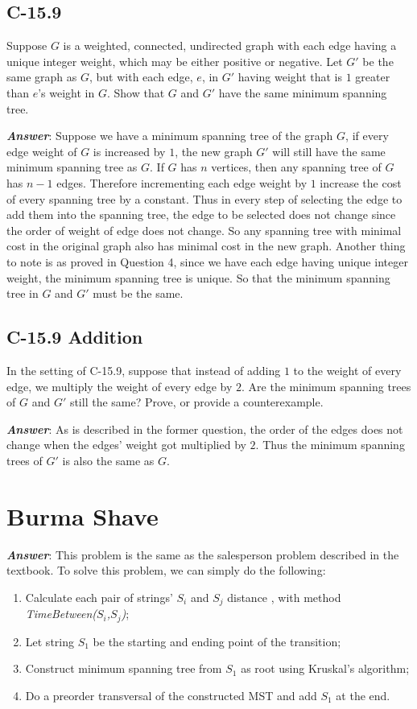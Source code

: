 \documentclass[11pt]{article}
\begin{document}
\subsection{C-15.9}
Suppose $G$ is a weighted, connected, undirected graph with each edge having a unique integer weight, which may be either positive or negative. Let $G'$ be the same graph as $G$, but with each edge, $e$, in $G'$ having weight that is $1$ greater than $e$’s weight in $G$. Show that $G$ and $G'$ have the same minimum spanning tree.

\noindent \textbf{\emph{Answer}}: Suppose we have a minimum spanning tree of the graph $G$, if every edge weight of $G$ is increased by $1$, the new graph $G'$ will still have the same minimum spanning tree as $G$. If $G$ has $n$ vertices, then any spanning tree of $G$ has $n-1$ edges. Therefore incrementing each edge weight by $1$ increase the cost of every spanning tree by a constant. Thus in every step of selecting the edge to add them into the spanning tree, the edge to be selected does not change since the order of weight of edge does not change. So any spanning tree with minimal cost in the original graph also has minimal cost in the new graph. Another thing to note is as proved in Question 4, since we have each edge having unique integer weight, the minimum spanning tree is unique. So that the minimum spanning tree in $G$ and $G'$ must be the same.
\subsection{C-15.9 Addition}
In the setting of C-15.9, suppose that instead of adding $1$ to the weight of every edge, we multiply the weight of every edge by $2$. Are the minimum spanning trees of $G$ and $G'$ still the same? Prove, or provide a counterexample.

\noindent \textbf{\emph{Answer}}: As is described in the former question, the order of the edges does not change when the edges' weight got multiplied by $2$. Thus the minimum spanning trees of $G'$ is also the same as $G$.

\section{Burma Shave}

\noindent \textbf{\emph{Answer}}: This problem is the same as the salesperson problem described in the textbook. To solve this problem, we can simply do the following:
\begin{enumerate}
	\item Calculate each pair of strings' $S_i$ and $S_j$ distance , with method \emph{TimeBetween($S_i$,$S_j$)};
	\item Let string $S_1$ be the starting and ending point of the transition;
	\item Construct minimum spanning tree from $S_1$ as root using Kruskal's algorithm;
	\item Do a preorder transversal of the constructed MST and add $S_1$ at the end.
\end{enumerate}
\end{document}
